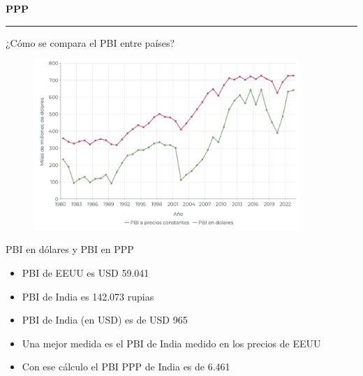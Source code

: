 \documentclass{beamer}
\begin{document}
\begin{frame}{}
\centering\huge\textbf{PPP} 
\vspace{2mm}
\hrule
\end{frame}

\begin{frame}{¿Cómo se compara el PBI entre países?}
    \begin{figure} [H]   \includegraphics[width=0.9\textwidth]{Slides Principios de Economia/Figures/29.10.pdf}
\end{figure}
\end{frame}
                   
\begin{frame}{PBI en dólares y PBI en PPP}
\begin{itemize}
    \item PBI de EEUU es USD 59.041 \vspace{1mm}
    \item PBI de India es 142.073 rupias \vspace{1mm}
    \item PBI de India (en USD) es de USD 965  \vspace{1mm}
    \item Una mejor medida es el PBI de India medido en los precios de EEUU \vspace{1mm}
    \item Con ese cálculo el PBI PPP de India es de 6.461
\end{itemize}
\end{frame}
\end{document}
